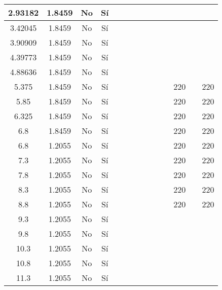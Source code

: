 \begin{table}[H]
{\begin{tabular}{|c|c|c|c|c|c|c|c|c|c|c|c|c|c|}
\hline
2.93182 & 1.8459 & No  & Sí  &     &     &     &     &     &     &     &     &     &  \bigstrut\\
\hline
3.42045 & 1.8459 & No  & Sí  &     &     &     &     &     &     &     &     &     &  \bigstrut\\
\hline
3.90909 & 1.8459 & No  & Sí  &     &     &     &     &     &     &     &     &     &  \bigstrut\\
\hline
4.39773 & 1.8459 & No  & Sí  &     &     &     &     &     &     &     &     &     &  \bigstrut\\
\hline
4.88636 & 1.8459 & No  & Sí  &     &     &     &     &     &     &     &     &     &  \bigstrut\\
\hline
5.375 & 1.8459 & No  & Sí  &     &     &     &     &     &     &     & 220 &     & 220 \bigstrut\\
\hline
5.85 & 1.8459 & No  & Sí  &     &     &     &     &     &     &     & 220 &     & 220 \bigstrut\\
\hline
6.325 & 1.8459 & No  & Sí  &     &     &     &     &     &     &     & 220 &     & 220 \bigstrut\\
\hline
6.8 & 1.8459 & No  & Sí  &     &     &     &     &     &     &     & 220 &     & 220 \bigstrut\\
\hline
6.8 & 1.2055 & No  & Sí  &     &     &     &     &     &     &     & 220 &     & 220 \bigstrut\\
\hline
7.3 & 1.2055 & No  & Sí  &     &     &     &     &     &     &     & 220 &     & 220 \bigstrut\\
\hline
7.8 & 1.2055 & No  & Sí  &     &     &     &     &     &     &     & 220 &     & 220 \bigstrut\\
\hline
8.3 & 1.2055 & No  & Sí  &     &     &     &     &     &     &     & 220 &     & 220 \bigstrut\\
\hline
8.8 & 1.2055 & No  & Sí  &     &     &     &     &     &     &     & 220 &     & 220 \bigstrut\\
\hline
9.3 & 1.2055 & No  & Sí  &     &     &     &     &     &     &     &     &     &  \bigstrut\\
\hline
9.8 & 1.2055 & No  & Sí  &     &     &     &     &     &     &     &     &     &  \bigstrut\\
\hline
10.3 & 1.2055 & No  & Sí  &     &     &     &     &     &     &     &     &     &  \bigstrut\\
\hline
10.8 & 1.2055 & No  & Sí  &     &     &     &     &     &     &     &     &     &  \bigstrut\\
\hline
11.3 & 1.2055 & No  & Sí  &     &     &     &     &     &     &     &     &     &  \bigstrut\\

\end{tabular}}
\end{table}
